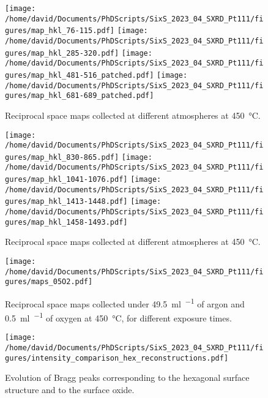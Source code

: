 \begin{figure}[!htb]
    \centering
    \texttt{[image: /home/david/Documents/PhDScripts/SixS\_2023\_04\_SXRD\_Pt111/figures/map\_hkl\_76-115.pdf]}
    \texttt{[image: /home/david/Documents/PhDScripts/SixS\_2023\_04\_SXRD\_Pt111/figures/map\_hkl\_285-320.pdf]}
    \texttt{[image: /home/david/Documents/PhDScripts/SixS\_2023\_04\_SXRD\_Pt111/figures/map\_hkl\_481-516\_patched.pdf]}
    \texttt{[image: /home/david/Documents/PhDScripts/SixS\_2023\_04\_SXRD\_Pt111/figures/map\_hkl\_681-689\_patched.pdf]}
    \caption{
        Reciprocal space maps collected at different atmospheres at \qty{450}{\degreeCelsius}.
    }
    \label{fig:MapsPt111A}
\end{figure}

\begin{figure}[!htb]
    \centering
    \texttt{[image: /home/david/Documents/PhDScripts/SixS\_2023\_04\_SXRD\_Pt111/figures/map\_hkl\_830-865.pdf]}
    \texttt{[image: /home/david/Documents/PhDScripts/SixS\_2023\_04\_SXRD\_Pt111/figures/map\_hkl\_1041-1076.pdf]}
    \texttt{[image: /home/david/Documents/PhDScripts/SixS\_2023\_04\_SXRD\_Pt111/figures/map\_hkl\_1413-1448.pdf]}
    \texttt{[image: /home/david/Documents/PhDScripts/SixS\_2023\_04\_SXRD\_Pt111/figures/map\_hkl\_1458-1493.pdf]}
    \caption{
        Reciprocal space maps collected at different atmospheres at \qty{450}{\degreeCelsius}.
    }
    \label{fig:MapsPt111B}
\end{figure}

\begin{figure}[!htb]
    \centering
    \texttt{[image: /home/david/Documents/PhDScripts/SixS\_2023\_04\_SXRD\_Pt111/figures/maps\_05O2.pdf]}
    \caption{
        Reciprocal space maps collected under \qty{49.5}{\ml\per\min} of argon and \qty{0.5}{\ml\per\min} of oxygen at \qty{450}{\degreeCelsius}, for different exposure times.
    }
    \label{fig:MapsPt111LowOxygen}
\end{figure}

\begin{figure}[!htb]
    \centering
    \texttt{[image: /home/david/Documents/PhDScripts/SixS\_2023\_04\_SXRD\_Pt111/figures/intensity\_comparison\_hex\_reconstructions.pdf]}
    \caption{
        Evolution of Bragg peaks corresponding to the hexagonal surface structure and to the surface oxide.
    }
    \label{fig:MapsPt111B}
\end{figure}


